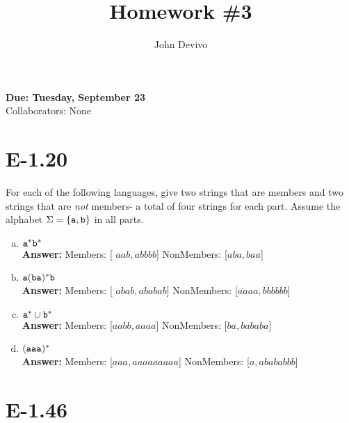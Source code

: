 \documentclass{article}
\author{John Devivo}          %
\title{Homework \#3}       %
\begin{document}
\maketitle
\begin{center}     %
\Large{\bf Due: Tuesday, September 23}\\
Collaborators: None
\end{center}       %

\section*{E-1.20}

For each of the following languages, give two strings that are 
members and two strings that are {\em not} members- a total of
four strings for each part.
Assume the alphabet $\Sigma = \{{\tt a},{\tt b}\}$ in all parts.
\begin{enumerate}[a.]
\item ${\tt a}^*{\tt b}^*$\\
{\bf Answer: } Members: [ ${aab}, {abbbb}$] NonMembers: [${aba}, {baa}$]

\item ${\tt a}({\tt ba})^*{\tt b}$\\
{\bf Answer: } Members: [ ${abab}, {ababab}]$ NonMembers: [${aaaa}, {bbbbbb}$]

\item ${\tt a}^* \cup {\tt b}^*$\\
{\bf Answer: } Members: [$ {aabb}, {aaaa}$] NonMembers: [${ba}, {bababa}$]

\item $({\tt aaa})^*$\\
{\bf Answer: } Members: [${aaa}, {aaaaaaaaa}$] NonMembers: [${a}, {abababbb}$]

\end{enumerate}

\section*{E-1.46}
\end{document}
